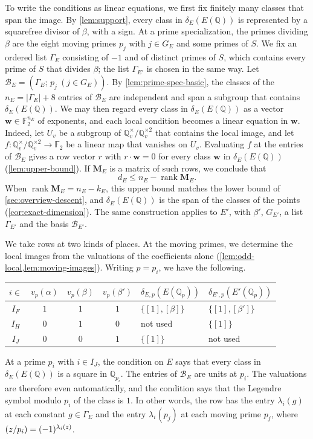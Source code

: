 \documentclass[12pt,oneside,openany]{book}
\theoremstyle{definition}
\theoremstyle{plain}
\numberwithin{equation}{chapter}
\theoremstyle{plain}
\theoremstyle{definition}
\theoremstyle{remark}
\newcommand{\Q}{\mathbb Q}
\newcommand{\F}{\mathbb F}
\DeclareMathOperator{\rk}{rank}
\newcommand{\leg}[2]{\mathchoice{\left(\frac{#1}{#2}\right)}{(#1/#2)}{(#1/#2)}{(#1/#2)}}
\newcommand{\sq}[1]{[#1]}
\newcommand{\sqgp}[1]{#1^{\times}/#1^{\times2}}
\newcommand{\cB}{\mathcal B}
\begin{document}
To write the conditions as linear equations, we first fix finitely many classes that span the image. By \cref{lem:support}, every class in $\delta_E(E(\Q))$ is represented by a squarefree divisor of $\beta$, with a sign. At a prime specialization, the primes dividing $\beta$ are the eight moving primes $p_j$ with $j\in G_E$ and some primes of $S$. We fix an ordered list $\Gamma_E$ consisting of $-1$ and of distinct primes of $S$, which contains every prime of $S$ that divides $\beta$; the list $\Gamma_{E'}$ is chosen in the same way. Let $\cB_E=(\Gamma_E;\,p_j\ (j\in G_E))$. By \cref{lem:prime-spec-basic}, the classes of the $n_E=|\Gamma_E|+8$ entries of $\cB_E$ are independent and span a subgroup that contains $\delta_E(E(\Q))$. We may then regard every class in $\delta_E(E(\Q))$ as a vector $\mathbf w\in\F_2^{n_E}$ of exponents, and each local condition becomes a linear equation in $\mathbf w$. Indeed, let $U_v$ be a subgroup of $\sqgp{\Q_v}$ that contains the local image, and let $f\colon\sqgp{\Q_v}\to\F_2$ be a linear map that vanishes on $U_v$. Evaluating $f$ at the entries of $\cB_E$ gives a row vector $r$ with $r\cdot\mathbf w=0$ for every class $\mathbf w$ in $\delta_E(E(\Q))$ (\cref{lem:upper-bound}). If $\mathbf M_E$ is a matrix of such rows, we conclude that
\begin{equation*}
d_E\le n_E-\rk\mathbf M_E.
\end{equation*}
When $\rk\mathbf M_E=n_E-k_E$, this upper bound matches the lower bound of \cref{sec:overview-descent}, and $\delta_E(E(\Q))$ is the span of the classes of the points (\cref{cor:exact-dimension}). The same construction applies to $E'$, with $\beta'$, $G_{E'}$, a list $\Gamma_{E'}$ and the basis $\cB_{E'}$.

We take rows at two kinds of places. At the moving primes, we determine the local images from the valuations of the coefficients alone (\cref{lem:odd-local,lem:moving-images}). Writing $p=p_i$, we have the following.
\begin{center}
\begin{tabular}{ccccll}
\toprule
$i\in$ & $v_p(\alpha)$ & $v_p(\beta)$ & $v_p(\beta')$ & $\delta_{E,p}(E(\Q_p))$ & $\delta_{E',p}(E'(\Q_p))$\\
\midrule
$I_F$ & $1$ & $1$ & $1$ & $\{\sq1,\sq\beta\}$ & $\{\sq1,\sq{\beta'}\}$\\
$I_H$ & $0$ & $1$ & $0$ & not used & $\{\sq1\}$\\
$I_J$ & $0$ & $0$ & $1$ & $\{\sq1\}$ & not used\\
\bottomrule
\end{tabular}
\end{center}
At a prime $p_i$ with $i\in I_J$, the condition on $E$ says that every class in $\delta_E(E(\Q))$ is a square in $\Q_{p_i}$. The entries of $\cB_E$ are units at $p_i$. The valuations are therefore even automatically, and the condition says that the Legendre symbol modulo $p_i$ of the class is $1$. In other words, the row has the entry $\lambda_i(g)$ at each constant $g\in\Gamma_E$ and the entry $\lambda_i(p_j)$ at each moving prime $p_j$, where $\leg z{p_i}=(-1)^{\lambda_i(z)}$.
\end{document}
